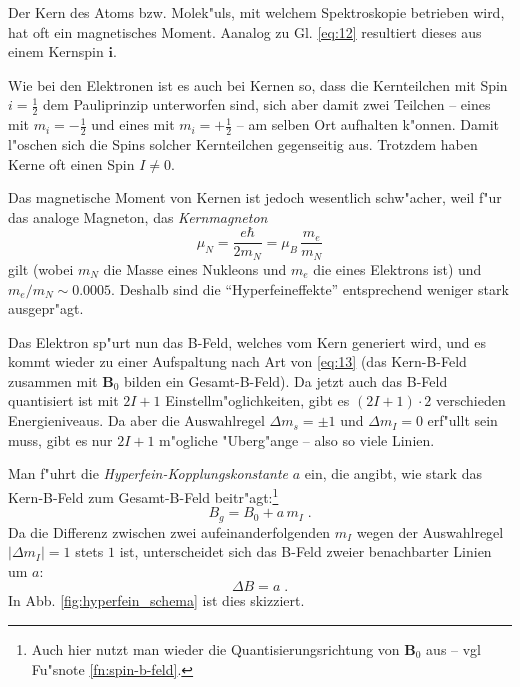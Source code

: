 \documentclass[a4paper,12pt]{article}
\renewcommand{\vec}[1]{\ensuremath{\boldsymbol{#1}}}
\begin{document}
Der Kern des Atoms bzw. Molek"uls, mit welchem Spektroskopie betrieben
wird, hat oft ein magnetisches Moment.  Aanalog zu Gl. \eqref{eq:12}
resultiert dieses aus einem Kernspin $\vec i$.

Wie bei den Elektronen ist es
auch bei Kernen so, dass die Kernteilchen mit Spin $i = \frac 1 2$ dem
Pauliprinzip unterworfen sind, sich aber damit zwei Teilchen -- eines
mit $m_i = - \frac 1 2$ und eines mit $m_i = + \frac 1 2$ -- am selben
Ort aufhalten k"onnen. Damit l"oschen sich die Spins solcher
Kernteilchen gegenseitig aus. Trotzdem haben Kerne oft einen Spin $I
\neq 0$.

Das magnetische Moment von Kernen ist jedoch wesentlich schw"acher,
weil f"ur das analoge Magneton, das \emph{Kernmagneton}
$$\mu_N = \frac{e \hbar}{2 m_N} =
\mu_B \, \frac{ m_e }{ m_N }$$ 
gilt (wobei $m_N$ die Masse eines Nukleons und $m_e$ die eines
Elektrons ist) und $m_e / m_N \sim 0.0005$. Deshalb sind die
"`Hyperfeineffekte"' entsprechend weniger stark ausgepr"agt.

Das Elektron sp"urt nun das B-Feld, welches vom Kern generiert wird,
und es kommt wieder zu einer Aufspaltung nach Art von \eqref{eq:13}
(das Kern-B-Feld zusammen mit $\vec B_0$ bilden ein Gesamt-B-Feld). Da
jetzt auch das B-Feld quantisiert ist mit $2I+1$
Einstellm"oglichkeiten, gibt es $(2I+1)\cdot 2$ verschieden
Energieniveaus. Da aber die Auswahlregel $\Delta m_s = \pm 1$ und
$\Delta m_I = 0$ erf"ullt sein muss, gibt es nur $2I+1$ m"ogliche
"Uberg"ange -- also so viele Linien.


Man f"uhrt die \emph{Hyperfein-Kopplungskonstante} $a$ ein, die
angibt, wie stark das Kern-B-Feld zum Gesamt-B-Feld
beitr"agt:\footnote{Auch hier nutzt man wieder die
  Quantisierungsrichtung von $\vec B_0$ aus -- vgl Fu"snote
  \ref{fn:spin-b-feld}. }
\begin{equation}
  \label{eq:15}
  B_g = B_0 + a \, m_I \;.
\end{equation}
Da die Differenz zwischen zwei aufeinanderfolgenden $m_I$ wegen der Auswahlregel $| \Delta m_I | = 1$ stets $1$
ist, unterscheidet sich das B-Feld zweier benachbarter Linien um $a$:
\begin{equation}
  \label{eq:16}
  \Delta B = a \;.
\end{equation}
In Abb. \ref{fig:hyperfein_schema} ist dies skizziert.
\end{document}
